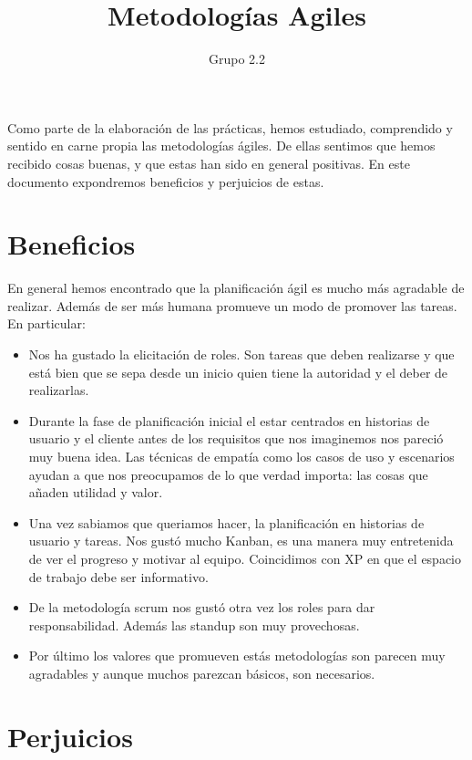 \documentclass[11pt,a4paper]{article}
\title{Metodologías Agiles}
\author{Grupo 2.2 }
\date{}
\begin{document}
\maketitle

Como parte de la elaboración de las prácticas, hemos estudiado, comprendido y sentido en carne propia las metodologías ágiles. De ellas sentimos que hemos recibido cosas buenas, y que estas han sido en general positivas. En este documento expondremos beneficios y perjuicios de estas.

\section{Beneficios}

En general hemos encontrado que la planificación ágil es mucho más agradable de realizar. Además de ser más humana promueve un modo de promover las tareas. En particular:

\begin{itemize}
    \item Nos ha gustado la elicitación de roles. Son tareas que deben realizarse y que está bien que se sepa desde un inicio quien tiene la autoridad y el deber de realizarlas.

	\item Durante la fase de planificación inicial el estar centrados en historias de usuario y el cliente antes de los requisitos que nos imaginemos nos pareció muy buena idea. Las técnicas de empatía como los casos de uso y escenarios ayudan a que nos preocupamos de lo que verdad importa: las cosas que añaden utilidad y valor.
	
    \item Una vez sabiamos que queriamos hacer, la planificación en historias de usuario y tareas. Nos gustó mucho Kanban, es una manera muy entretenida de ver el progreso y motivar al equipo. Coincidimos con XP en que el espacio de trabajo debe ser informativo. 
    
    \item De la metodología scrum nos gustó otra vez los roles para dar responsabilidad. Además las standup son muy provechosas.
    
    \item Por último los valores que promueven estás metodologías son parecen muy agradables y aunque muchos parezcan básicos, son necesarios.
\end{itemize}

\section{Perjuicios}
\end{document}
